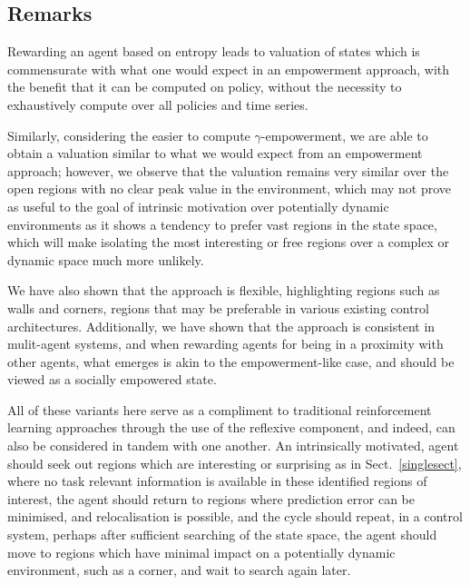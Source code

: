 \documentclass{article}
\begin{document}
\subsection{Remarks}
Rewarding an agent based on entropy leads to valuation of states which is commensurate with what one would expect in an empowerment approach, with the benefit that it can be computed on policy, without the necessity to exhaustively compute over all policies and time series.

Similarly, considering the easier to compute $\gamma$-empowerment, we are able to obtain a valuation similar to what we would expect from an empowerment approach; however, we observe that the valuation remains very similar over the open regions with no clear peak value in the environment, which may not prove as useful to the goal of intrinsic motivation over potentially dynamic environments as it shows a tendency to prefer vast regions in the state space, which will make isolating the most interesting or free regions over a complex or dynamic space much more unlikely.

We have also shown that the approach is flexible, highlighting regions such as walls and corners, regions that may be preferable in various existing control architectures. Additionally, we have shown that the approach is consistent in mulit-agent systems, and when rewarding agents for being in a proximity with other agents, what emerges is akin to the empowerment-like case, and should be viewed as a socially empowered state.


All of these variants here serve as a compliment to traditional reinforcement learning approaches through the use of the reflexive component, and indeed, can also be considered in tandem with one another. An intrinsically motivated, agent should seek out regions which are interesting or surprising as in Sect.~\ref{singlesect}, where no task relevant information is available in these identified regions of interest, the agent should return to regions where prediction error can be minimised, and relocalisation is possible, and the cycle should repeat, in a control system, perhaps after sufficient searching of the state space, the agent should move to regions which have minimal impact on a potentially dynamic environment, such as a corner, and wait to search again later.
\end{document}
